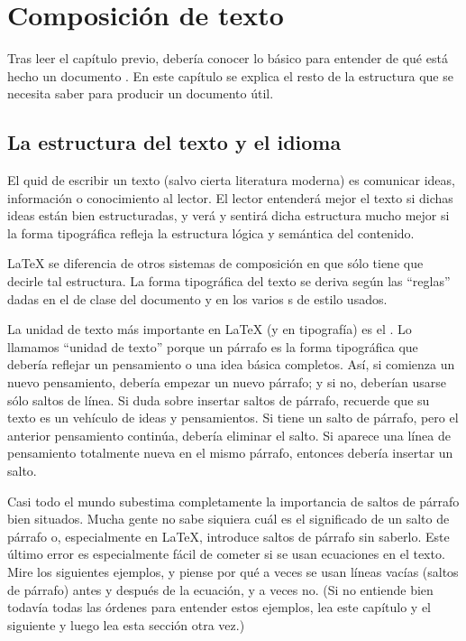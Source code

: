 \chapter{Composición de texto}

\begin{intro}
    Tras leer el capítulo previo, debería conocer lo básico para entender de qué está hecho un documento \LaTeXe{}.  En este capítulo se explica el resto de la estructura que se necesita saber para producir un documento útil. 
\end{intro}

\section{La estructura del texto y el idioma}

El quid de escribir un texto (salvo cierta literatura moderna) es comunicar ideas, información o conocimiento al lector.  El lector entenderá mejor el texto si dichas ideas están bien estructuradas, y verá y sentirá dicha estructura mucho mejor si la forma tipográfica refleja la estructura lógica y semántica del contenido.

\LaTeX{} se diferencia de otros sistemas de composición en que sólo tiene que decirle tal estructura.  La forma tipográfica del texto se deriva según las ``reglas'' dadas en el \filenomo{} de clase del documento y en los varios \filenomo{}s de estilo usados.

La unidad de texto más importante en \LaTeX{} (y en tipografía) es el .  Lo llamamos ``unidad de texto'' porque un párrafo es la forma tipográfica que debería reflejar un pensamiento o una idea básica completos.  Así, si comienza un nuevo pensamiento, debería empezar un nuevo párrafo; y si no, deberían usarse sólo saltos de línea.  Si duda sobre insertar saltos de párrafo, recuerde que su texto es un vehículo de ideas y pensamientos.  Si tiene un salto de párrafo, pero el anterior pensamiento continúa, debería eliminar el salto.  Si aparece una línea de pensamiento totalmente nueva en el mismo párrafo, entonces debería insertar un salto.

Casi todo el mundo subestima completamente la importancia de saltos de párrafo bien situados.  Mucha gente no sabe siquiera cuál es el significado de un salto de párrafo o, especialmente en \LaTeX, introduce saltos de párrafo sin saberlo.  Este último error es especialmente fácil de cometer si se usan ecuaciones en el texto. Mire los siguientes ejemplos, y piense por qué a veces se usan líneas vacías (saltos de párrafo) antes y después de la ecuación, y a veces no.  (Si no entiende bien todavía todas las órdenes para entender estos ejemplos, lea este capítulo y el siguiente y luego lea esta sección otra vez.)

